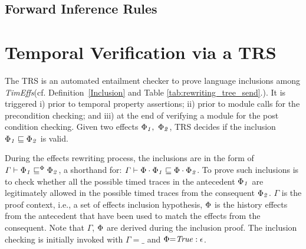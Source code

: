 \documentclass[acmsmall,10pt,review]{acmart}
\newcommand{\timedEffects}{\emph{TimEffs}}
\newcommand{\effect}{\textcolor{black}{\ensuremath{\mathrm{\Phi}}}}
\newcommand{\code}[1]{{\tt{\ensuremath{\m{#1}}}}}
\newcommand{\empt}{\textcolor{black}{\ensuremath{\epsilon}}}
\newcommand{\CONTAIN}{\sqsubseteq}
\newcommand{\m}{\mathit}
\newcommand\figref[1]{Fig. \textcolor{black}{\ref{#1}}.}
\newcommand\tabref[1]{Table \textcolor{black}{\ref{#1}}.}
\newcommand\defref[1]{Definition~\textcolor{blue}{\ref{#1}}}
\begin{document}
{%









\subsection{Forward Inference Rules}
\label{Forward_Rules}

     




\section{Temporal Verification via a TRS}
\label{sec:Entailment_Prover}


The TRS  is an automated entailment checker to prove language inclusions among \timedEffects (cf. \defref{Inclusion} and \tabref{tab:rewriting_tree_send}). It is triggered i) prior to temporal property assertions; ii) prior to module calls for the precondition checking; and iii) at the end of verifying a module for the post condition checking. Given two effects \code{\effect_1,\ \effect_2}, TRS decides if the inclusion \code{\effect_1 \CONTAIN  \effect_2 } is valid. 

During the effects rewriting process, the inclusions are in the form of \code{\Gamma \vdash  \effect_1 \CONTAIN^{\effect}  \effect_2 }, a shorthand for: \code{\Gamma \vdash  \effect \cdot \effect_1 \CONTAIN   \effect \cdot  \effect_2}. To prove such inclusions is to check whether all the possible timed traces in the antecedent \code{\effect_1} are legitimately allowed  in the possible timed traces from the consequent \code{\effect_2}.
\code{\Gamma} is the proof context, i.e., a set of effects inclusion hypothesis, \code{\effect} is the history effects from the antecedent that have been used to match the effects from the consequent.
Note that \code{\Gamma}, \code{\effect} are derived during the inclusion proof. 
The inclusion checking is initially invoked with \code{\Gamma{=}\_} and \code{\effect{=} True : \empt}. 







}
\end{document}
